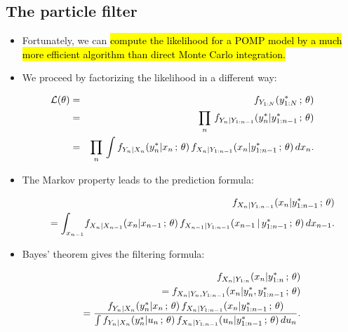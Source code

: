 \documentclass[]{article}
\providecommand{\tightlist}{%
  \setlength{\itemsep}{0pt}\setlength{\parskip}{0pt}}
\begin{document}
\hypertarget{the-particle-filter}{\subsection{The particle
filter}\label{the-particle-filter}}

\begin{itemize}
\item
  Fortunately, we can \hl{compute the likelihood for a POMP model by a much
  more efficient algorithm than direct Monte Carlo integration.}
\item
  We proceed by factorizing the likelihood in a different way:
\end{itemize}

\begin{eqnarray}
\mathcal{L}(\theta)&=&f_{Y_{1:N}}(y^*_{1:N}\, ; \, \theta)
\\
&=&
\prod_{n}\,f_{Y_n|Y_{1:n-1}}(y^*_n|y^*_{1:n-1}\, ; \,\theta) 
\\
&=&
\prod_{n}\,\int f_{Y_n|X_n}(y^*_n|x_n\, ; \,\theta)\,f_{X_n|Y_{1:n-1}}(x_n|y^*_{1:n-1}\, ; \,\theta)\, dx_{n}.
\end{eqnarray}

\begin{itemize}
\tightlist
\item
  The Markov property leads to the prediction formula:
\end{itemize}

\begin{eqnarray}
&&f_{X_n|Y_{1:n-1}}(x_n|y^*_{1:n-1}\, ; \, \theta) 
\\
&&\quad
= \int_{x_{n-1}} \! f_{X_n|X_{n-1}}(x_n|x_{n-1}\, ; \,\theta)\, f_{X_{n-1}|Y_{1:n-1}}(x_{n-1}{\, | \,} y^*_{1:n-1}\, ; \, \theta) \, dx_{n-1}.
\end{eqnarray}

\begin{itemize}
\tightlist
\item
  Bayes' theorem gives the filtering formula:
\end{itemize}

\begin{eqnarray}
&&f_{X_n|Y_{1:n}}(x_n|y^*_{1:n}\, ; \, \theta)
\\
&&\quad = f_{X_n|Y_n,Y_{1:n-1}}(x_n|y^*_n,y^*_{1:n-1}\, ; \, \theta) 
\\
&&\quad =\frac{f_{Y_n|X_n}(y^*_{n}|x_{n}\, ; \,\theta)\,f_{X_n|Y_{1:n-1}}(x_{n}|y^*_{1:n-1}\, ; \,\theta)}{\int
f_{Y_n|X_n}(y^*_{n}|u_{n}\, ; \,\theta)\,f_{X_n|Y_{1:n-1}}(u_{n}|y^*_{1:n-1}\, ; \,\theta)\, du_n}.
\end{eqnarray}
\end{document}
